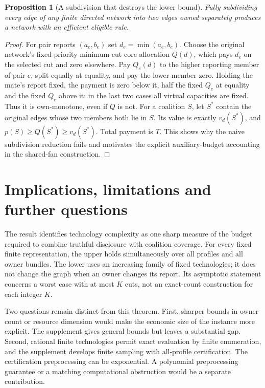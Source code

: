 \documentclass[11pt]{article}
\newtheorem{proposition}[theorem]{Proposition}
\theoremstyle{definition}\newtheorem{definition}[theorem]{Definition}
\theoremstyle{remark}\newtheorem{remark}[theorem]{Remark}
\begin{document}
\begin{proposition}[A subdivision that destroys the lower bound]\label{dag:subdivision}
Fully subdividing every edge of any finite directed network into two edges
owned separately produces a network with an efficient eligible rule.
\end{proposition}
\begin{proof}
For pair reports $(a_e,b_e)$ set $d_e=\min(a_e,b_e)$. Choose the original
network's fixed-priority minimum-cut core allocation $Q(d)$, which pays
$d_e$ on the selected cut and zero elsewhere. Pay $Q_e(d)$ to the higher
reporting member of pair $e$, split equally at equality, and pay the lower
member zero. Holding the mate's report fixed, the payment is zero below it,
half the fixed $Q_e$ at equality and the fixed $Q_e$ above it: in the last
two cases all virtual capacities are fixed. Thus it is own-monotone, even
if $Q$ is not. For a coalition $S$, let $S^*$ contain the original edges
whose two members both lie in $S$. Its value is exactly $v_d(S^*)$, and
$p(S)\ge Q(S^*)\ge v_d(S^*)$. Total payment is $T$. This shows why the naive subdivision reduction fails and motivates the
explicit auxiliary-budget accounting in the shared-fan construction.
\end{proof}


\section{Implications, limitations and further questions}
The result identifies technology complexity as one sharp measure of the
budget required to combine truthful disclosure with coalition coverage.
For every fixed finite representation, the upper holds simultaneously over
all profiles and all owner bundles. The lower uses an increasing family of
fixed technologies; it does not change the graph when an owner changes its
report. Its asymptotic statement concerns a worst case with at most $K$ cuts,
not an exact-count construction for each integer $K$.

Two questions remain distinct from this theorem. First, sharper bounds in
owner count or resource dimension would make the economic size of the
instance more explicit. The supplement gives general bounds but leaves a
substantial gap. Second, rational finite technologies permit exact evaluation
by finite enumeration, and the supplement develops finite sampling with
all-profile certification. The certification preprocessing can be exponential.
A polynomial preprocessing guarantee or a matching computational obstruction
would be a separate contribution.
\end{document}
